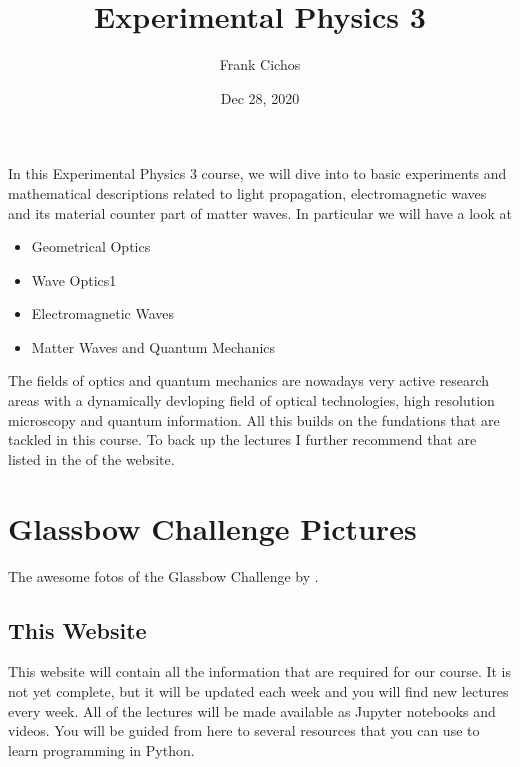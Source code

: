 \documentclass[letterpaper,10pt,english]{sphinxmanual}
\title{Experimental Physics 3}
\date{Dec 28, 2020}
\author{Frank Cichos}
\let\sphinxpxdimen\pdfpxdimen\else\newdimen\sphinxpxdimen
\begin{document}
\pagestyle{empty}
\sphinxmaketitle
\pagestyle{plain}
\sphinxtableofcontents
\pagestyle{normal}
\label{\detokenize{index::doc}}
\begin{figure}[htbp]
\centering

\noindent\sphinxincludegraphics[width=8711\sphinxpxdimen,height=1893\sphinxpxdimen]{{CompSoft_banner}.png}
\end{figure}



In this Experimental Physics 3 course, we will dive into to basic experiments and mathematical descriptions related to light propagation, electromagnetic waves and its material counter part of matter waves. In particular we will have a look at
\begin{itemize}
\item {} 
Geometrical Optics

\item {} 
Wave Optics1

\item {} 
Electromagnetic Waves

\item {} 
Matter Waves and Quantum Mechanics

\end{itemize}

The fields of optics and quantum mechanics are nowadays very active research areas with a dynamically devloping field of optical technologies, high resolution microscopy and quantum information. All this builds on the fundations that are tackled in this course. To back up the lectures I further recommend  that are listed in the  of the website.


\chapter{Glassbow Challenge Pictures}
\label{\detokenize{index:glassbow-challenge-pictures}}
The awesome fotos of the Glassbow Challenge by .

\noindent{}

\noindent{}

\noindent{}


\section{This Website}
\label{\detokenize{course-info/website:this-website}}\label{\detokenize{course-info/website::doc}}
This website will contain all the information that are required for our  course. It is not yet complete, but it will be updated each week and you will find new lectures every week.
All of the lectures will be made available as Jupyter notebooks and videos.
You will be guided from here to several resources that you can use to learn programming in Python.
\end{document}
